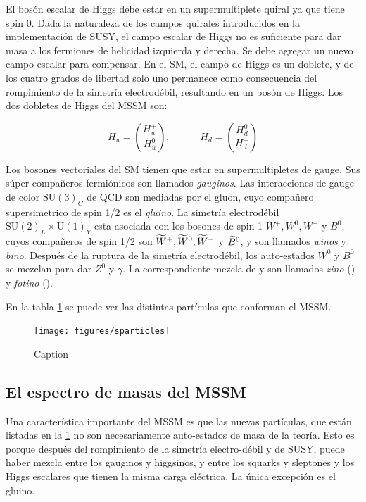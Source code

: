 El bosón escalar de Higgs debe estar en un supermultiplete quiral ya
que tiene spin 0. Dada la naturaleza de los campos quirales
introducidos en la implementación de SUSY, el campo escalar de Higgs
no es suficiente para dar masa a los fermiones de helicidad izquierda
y derecha. Se debe agregar un nuevo campo escalar para compensar. En
el SM, el campo de Higgs es un doblete, y de los cuatro grados de
libertad solo uno permanece como consecuencia del rompimiento de la
simetría electrodébil, resultando en un bosón de Higgs. Los dos
dobletes de Higgs del MSSM son:

\begin{equation}
  H_u = \binom{H_u^+}{H_u^0}, \quad \quad \quad H_d =
  \binom{H_d^0}{H_d^-}
\end{equation}

Los bosones vectoriales del SM tienen que estar en supermultipletes de
gauge. Sus súper-compañeros fermiónicos son llamados \emph{gauginos}.
Las interacciones de gauge de color $\text{SU}(3)_C$ de QCD son
mediadas por el gluon, cuyo compañero supersimetrico de spin 1/2 es el
\emph{gluino}. La simetría electrodébil $\text{SU}(2)_L \times
\text{U}(1)_Y$ esta asociada con los bosones de spin 1 $W^+, W^0, W^-$
y $B^0$, cuyos compañeros de spin 1/2 son $\widetilde{W}^+, \widetilde{W}^0,
\widetilde{W}^-$ y $\widetilde{B}^0$, y son llamados \emph{winos} y \emph{bino}.
Después de la ruptura de la simetría electrodébil, los auto-estados
$W^0$ y $B^0$ se mezclan para dar $Z^0$ y $\gamma$. La correspondiente
mezcla de {\winozero} y {\bino} son llamados \emph{zino} (\zino) y
\emph{fotino} (\photino).

En la tabla \ref{tab:sparticles} se puede ver las distintas
partículas que conforman el MSSM.

\begin{figure}[h]
  \centering \texttt{[image: figures/sparticles]}
  \caption{Caption}
  \label{tab:sparticles}
\end{figure}


\subsection{El espectro de masas del MSSM}

Una característica importante del MSSM es que las nuevas partículas,
que están listadas en la \cref{tab:sparticles} no son necesariamente
auto-estados de masa de la teoría. Esto es porque después del
rompimiento de la simetría electro-débil y de SUSY, puede haber mezcla
entre los gauginos y higgsinos, y entre los squarks y sleptones y los
Higgs escalares que tienen la misma carga eléctrica. La única
excepción es el gluino.

